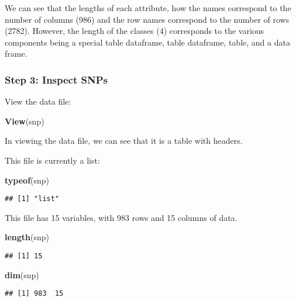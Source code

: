 \documentclass[]{article}
\newenvironment{Shaded}{\begin{snugshade}}{\end{snugshade}}
\newcommand{\KeywordTok}[1]{\textcolor[rgb]{0.13,0.29,0.53}{\textbf{#1}}}
\newcommand{\NormalTok}[1]{#1}
\begin{document}
We can see that the lengths of each attribute, how the names correspond
to the number of columns (986) and the row names correspond to the
number of rows (2782). However, the length of the classes (4)
corresponds to the various components being a special table dataframe,
table dataframe, table, and a data frame.

\hypertarget{step-3-inspect-snps}{%
\subsubsection{Step 3: Inspect SNPs}\label{step-3-inspect-snps}}

View the data file:

\begin{Shaded}
\begin{Highlighting}[]
\KeywordTok{View}\NormalTok{(snp)}
\end{Highlighting}
\end{Shaded}

In viewing the data file, we can see that it is a table with headers.

This file is currently a list:

\begin{Shaded}
\begin{Highlighting}[]
\KeywordTok{typeof}\NormalTok{(snp)}
\end{Highlighting}
\end{Shaded}

\begin{verbatim}
## [1] "list"
\end{verbatim}

This file has 15 variables, with 983 rows and 15 columns of data.

\begin{Shaded}
\begin{Highlighting}[]
\KeywordTok{length}\NormalTok{(snp)}
\end{Highlighting}
\end{Shaded}

\begin{verbatim}
## [1] 15
\end{verbatim}

\begin{Shaded}
\begin{Highlighting}[]
\KeywordTok{dim}\NormalTok{(snp)}
\end{Highlighting}
\end{Shaded}

\begin{verbatim}
## [1] 983  15
\end{verbatim}
\end{document}
